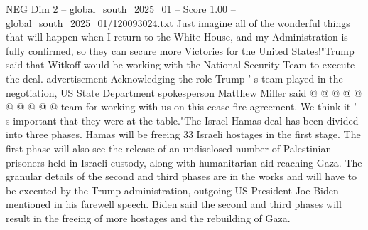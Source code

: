 \begin{textsample}{NEG Dim 2 – global\_south\_2025\_01 – Score 1.00 – global\_south\_2025\_01/120093024.txt}
Just imagine all of the wonderful things that will happen when I return to the White House, and my Administration is fully confirmed, so they can secure more Victories for the United States!"Trump said that Witkoff would be working with the National Security Team to execute the deal. advertisement Acknowledging the role Trump ' s team played in the negotiation, US State Department spokesperson Matthew Miller said @ @ @ @ @ @ @ @ @ @ team for working with us on this cease-fire agreement.
We think it ' s important that they were at the table."The Israel-Hamas deal has been divided into three phases.
Hamas will be freeing 33 Israeli hostages in the first stage.
The first phase will also see the release of an undisclosed number of Palestinian prisoners held in Israeli custody, along with humanitarian aid reaching Gaza.
The granular details of the second and third phases are in the works and will have to be executed by the Trump administration, outgoing US President Joe Biden mentioned in his farewell speech.
Biden said the second and third phases will result in the freeing of more hostages and the rebuilding of Gaza.

\end{textsample}
